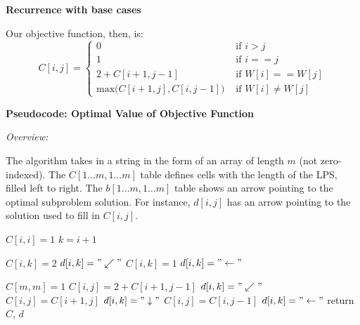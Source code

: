 \documentclass[a4paper]{report}
\begin{document}
\begin{enumerate}
      {\bf Recurrence with base cases}

      Our objective function, then, is:
      \begin{displaymath}
        C[i,j] = \left\{
          \begin{array}{lr}
            0  &   \text{ if $i > j$}\\
            1  &   \text{ if $i == j$ }\\
            2 + C[i+1, j-1]  &  \text{ if $W[i] == W[j]$}\\
            \text{max($C[i+1,j], C[i,j-1]$)}  &  \text{ if $W[i] \neq W[j]$ }
          \end{array}
          \right.
        \end{displaymath} 


      {\bf Pseudocode: Optimal Value of Objective Function}

      {\it Overview:}

      The algorithm takes in a string in the form of an array of length $m$ (not zero-indexed). 
      The $C[1\dots m, 1\dots m]$ table defines cells with the length of the LPS, filled left to right.
      The $b[1\dots m, 1\dots m]$ table shows an arrow pointing to the optimal subproblem solution. For instance, 
      $d[i, j]$ has an arrow pointing to the solution used to fill in $C[i, j]$.


      \begin{algorithmic}[1]


            \State $C[i,i] = 1$
            \State $k = i + 1$

              \State $C[i,k] = 2$
              \State $d[i,k] = "\swarrow"$
            \Else
              \State $C[i,k] = 1$
              \State $d[i,k] = "\leftarrow"$
            \EndIf
          \EndFor

          \State $C[m,m] = 1$
                \State $C[i,j] = 2+ C[i+1, j-1]$ 
                \State $d[i,k] = "\swarrow"$
                \State $C[i,j] = C[i+1, j]$ 
                \State $d[i,k] = "\downarrow"$
                \State $C[i,j] = C[i, j-1]$ 
                \State $d[i,k] = "\leftarrow"$
              \EndIf
            \EndFor
          \EndFor
          \State return $C$, $d$
        \EndFunction
      \end{algorithmic}


\end{enumerate}
\end{document}
